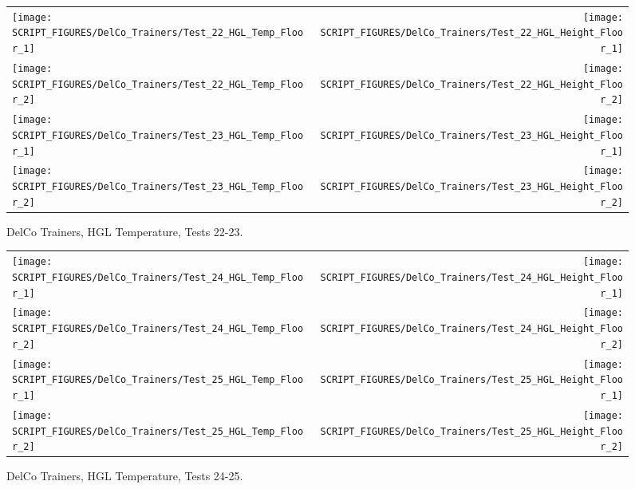 \begin{figure}[p]
\begin{tabular*}{\textwidth}{l@{\extracolsep{\fill}}r}
\texttt{[image: SCRIPT\_FIGURES/DelCo\_Trainers/Test\_22\_HGL\_Temp\_Floor\_1]} &
\texttt{[image: SCRIPT\_FIGURES/DelCo\_Trainers/Test\_22\_HGL\_Height\_Floor\_1]} \\
\texttt{[image: SCRIPT\_FIGURES/DelCo\_Trainers/Test\_22\_HGL\_Temp\_Floor\_2]} &
\texttt{[image: SCRIPT\_FIGURES/DelCo\_Trainers/Test\_22\_HGL\_Height\_Floor\_2]} \\
\texttt{[image: SCRIPT\_FIGURES/DelCo\_Trainers/Test\_23\_HGL\_Temp\_Floor\_1]} &
\texttt{[image: SCRIPT\_FIGURES/DelCo\_Trainers/Test\_23\_HGL\_Height\_Floor\_1]} \\
\texttt{[image: SCRIPT\_FIGURES/DelCo\_Trainers/Test\_23\_HGL\_Temp\_Floor\_2]} &
\texttt{[image: SCRIPT\_FIGURES/DelCo\_Trainers/Test\_23\_HGL\_Height\_Floor\_2]}
\end{tabular*}
\caption[DelCo Trainers, HGL Temperature, Tests 22-23]
{DelCo Trainers, HGL Temperature, Tests 22-23.}
\label{DelCo_HGL_22-23}
\end{figure}

\begin{figure}[p]
\begin{tabular*}{\textwidth}{l@{\extracolsep{\fill}}r}
\texttt{[image: SCRIPT\_FIGURES/DelCo\_Trainers/Test\_24\_HGL\_Temp\_Floor\_1]} &
\texttt{[image: SCRIPT\_FIGURES/DelCo\_Trainers/Test\_24\_HGL\_Height\_Floor\_1]} \\
\texttt{[image: SCRIPT\_FIGURES/DelCo\_Trainers/Test\_24\_HGL\_Temp\_Floor\_2]} &
\texttt{[image: SCRIPT\_FIGURES/DelCo\_Trainers/Test\_24\_HGL\_Height\_Floor\_2]} \\
\texttt{[image: SCRIPT\_FIGURES/DelCo\_Trainers/Test\_25\_HGL\_Temp\_Floor\_1]} &
\texttt{[image: SCRIPT\_FIGURES/DelCo\_Trainers/Test\_25\_HGL\_Height\_Floor\_1]} \\
\texttt{[image: SCRIPT\_FIGURES/DelCo\_Trainers/Test\_25\_HGL\_Temp\_Floor\_2]} &
\texttt{[image: SCRIPT\_FIGURES/DelCo\_Trainers/Test\_25\_HGL\_Height\_Floor\_2]}
\end{tabular*}
\caption[DelCo Trainers, HGL Temperature, Tests 24-25]
{DelCo Trainers, HGL Temperature, Tests 24-25.}
\label{DelCo_HGL_24-25}
\end{figure}



\clearpage


